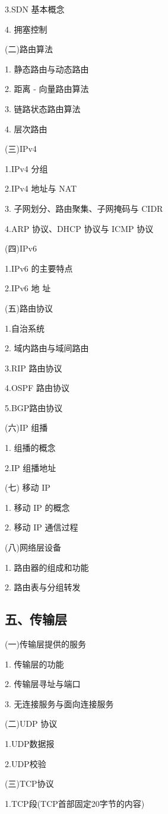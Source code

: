 \documentclass[10pt]{article}
\begin{document}
3.{\color{red}SDN 基本概念}

4. 拥塞控制

(二)路由算法

1. 静态路由与动态路由

2. 距离 - 向量路由算法

3. 链路状态路由算法

4. 层次路由 

(三)IPv4 

1.IPv4 分组 

2.IPv4 地址与 NAT 

3. 子网划分、路由聚集、子网掩码与 CIDR 

4.ARP 协议、DHCP 协议与 ICMP 协议 

(四){\color{red}IPv6} 

1.IPv6 的主要特点 

2.IPv6 地 址

(五)路由协议

1.自治系统 

2. 域内路由与域间路由 

3.RIP 路由协议 

4.OSPF 路由协议 

5.{\color{red}BGP路由协议}


(六){\color{red}IP 组播}


1. 组播的概念


2.IP 组播地址

(七) {\color{red}移动 IP}

1. 移动 IP 的概念

2. 移动 IP 通信过程

(八)网络层设备

1. 路由器的组成和功能

2. 路由表与分组转发

\subsection*{五、传输层}

(一)传输层提供的服务

1. 传输层的功能

2. {\color{red}传输层寻址与端口}

3. 无连接服务与面向连接服务

(二)UDP 协议

1.UDP数据报

2.{\color{red}UDP校验}

(三)TCP协议

1.TCP段(TCP首部固定20字节的内容)
\end{document}
